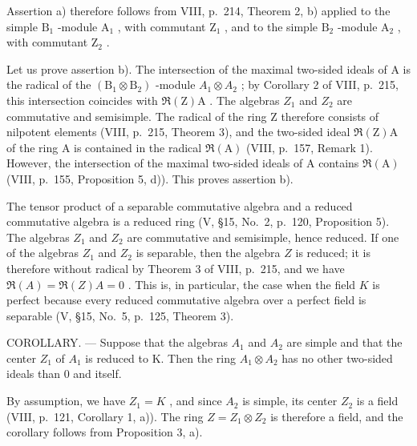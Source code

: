 Assertion a) therefore follows from VIII, p.~214, Theorem 2, b) applied to the simple \(\mathrm{B}_1\) -module \(\mathrm{A}_1\) , with commutant \(\mathrm{Z}_1\) , and to the simple \(\mathrm{B}_2\) -module \(\mathrm{A}_2\) , with commutant \(\mathrm{Z}_2\) .

Let us prove assertion b). The intersection of the maximal two-sided ideals of A is the radical of the \((\mathrm{B}_{1}\otimes\mathrm{B}_{2})\) -module \(A_{1}\otimes A_{2}\) ; by Corollary 2 of VIII, p.~215, this intersection coincides with \(\Re(\mathrm{Z})\mathrm{A}\) . The algebras \(Z_{1}\) and \(Z_{2}\) are commutative and semisimple. The radical of the ring Z therefore consists of nilpotent elements (VIII, p.~215, Theorem 3), and the two-sided ideal \(\Re(\mathrm{Z})\mathrm{A}\) of the ring A is contained in the radical \(\Re(\mathrm{A})\) (VIII, p.~157, Remark 1). However, the intersection of the maximal two-sided ideals of A contains \(\Re(\mathrm{A})\) (VIII, p.~155, Proposition 5, d)). This proves assertion b).

The tensor product of a separable commutative algebra and a reduced commutative algebra is a reduced ring (V, §15, No.~2, p.~120, Proposition 5). The algebras \(Z_1\) and \(Z_2\) are commutative and semisimple, hence reduced. If one of the algebras \(Z_1\) and \(Z_2\) is separable, then the algebra \(Z\) is reduced; it is therefore without radical by Theorem 3 of VIII, p.~215, and we have \(\Re(A) = \Re(Z)A = 0\) . This is, in particular, the case when the field \(K\) is perfect because every reduced commutative algebra over a perfect field is separable (V, §15, No.~5, p.~125, Theorem 3).

COROLLARY. --- Suppose that the algebras \(A_{1}\) and \(A_{2}\) are simple and that the center \(Z_{1}\) of \(A_{1}\) is reduced to K. Then the ring \(A_{1} \otimes A_{2}\) has no other two-sided ideals than 0 and itself.

By assumption, we have \(Z_{1} = K\) , and since \(A_{2}\) is simple, its center \(Z_{2}\) is a field (VIII, p.~121, Corollary 1, a)). The ring \(Z = Z_{1} \otimes Z_{2}\) is therefore a field, and the corollary follows from Proposition 3, a).

